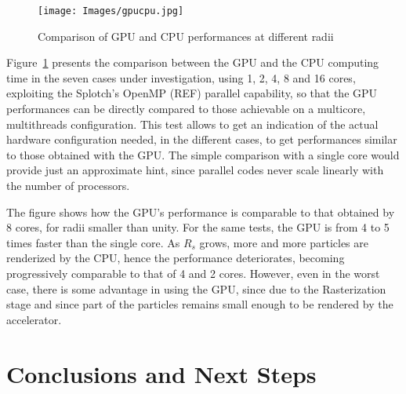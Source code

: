 \documentclass[11pt]{article}
\begin{document}
\begin{figure}
\centering
\texttt{[image: Images/gpucpu.jpg]}
\caption{Comparison of GPU and CPU performances at different radii}
\label{fig:gpucpu}
\end{figure}

Figure~\ref{fig:gpucpu} presents the comparison between the GPU and the CPU computing time
in the seven cases under investigation, using 
1, 2, 4, 8 and 16 cores, exploiting the Splotch's OpenMP (REF) parallel
capability, so that the GPU performances can be directly compared to
those achievable on a multicore, multithreads configuration.
This test allows to get an indication of the actual hardware configuration
needed, in the different cases, to get performances similar to those
obtained with the GPU. The simple comparison with a single core would provide 
just an approximate hint, since parallel codes never scale linearly with
the number of processors. 

The figure shows how the GPU's performance is 
comparable to that obtained by 8 cores, for radii smaller
than unity. For the same tests, the GPU is from 4 to 5 times faster than the single 
core. As $R_s$ grows, more and more particles are renderized by the CPU, hence 
the performance deteriorates, becoming progressively comparable to that
of 4 and 2 cores. However, even in
the worst case, there is some advantage in using the GPU, since
due to the Rasterization stage and since part of the particles 
remains small enough to be rendered by the accelerator.

\section{Conclusions and Next Steps}
\end{document}
